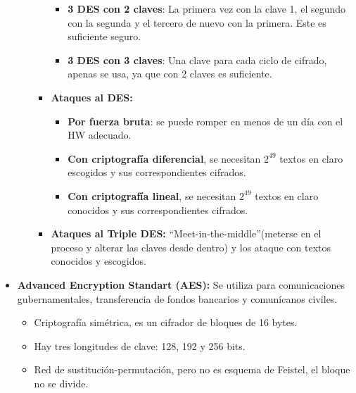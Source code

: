 \documentclass[12pt, twoside, openright]{report} %
\begin{document}
\begin{itemize}
\begin{itemize}
\begin{itemize}
        \begin{itemize}
        \item \textbf{3 DES con 2 claves}: La primera vez con la clave 1, el
          segundo con la segunda y el tercero de nuevo con la primera.
          Este es suficiente seguro.
          
        \item \textbf{3 DES con 3 claves}: Una clave para cada ciclo de
          cifrado, apenas se usa, ya que con 2 claves es suficiente.
          
        \end{itemize}
      \item \textbf{Ataques al DES:}
        

        \begin{itemize}
        \item \textbf{Por fuerza bruta}: se puede romper en menos de un día
          con el HW adecuado.
          
        \item \textbf{Con criptografía diferencial}, se necesitan $2^{49}$ textos
          en claro escogidos y sus correspondientes cifrados.
          
        \item \textbf{Con criptografía lineal}, se necesitan $2^{49}$ textos en
          claro conocidos y sus correspondientes cifrados.
          
        \end{itemize}
      \item \textbf{Ataques al Triple DES:} ``Meet-in-the-middle''(meterse
        en el proceso y alterar las claves desde dentro) y los ataque
        con textos conocidos y escogidos.
        
      \end{itemize}
    \end{itemize}
  \item \textbf{Advanced Encryption Standart (AES):} Se utiliza para
    comunicaciones gubernamentales, transferencia de fondos bancarios y
    comunícanos civiles.
    

    \begin{itemize}
    \item Criptografía simétrica, es un cifrador de bloques de 16 bytes.
      
    \item Hay tres longitudes de clave: 128, 192 y 256 bits.
      
    \item Red de sustitución-permutación, pero no es esquema de Feistel, el
      bloque no se divide.
      

\end{itemize}
\end{itemize}
\end{document}
